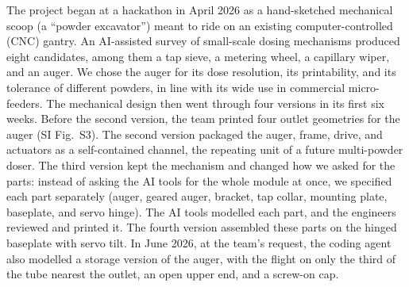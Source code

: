 \documentclass[twoside,twocolumn,9pt]{article}
\begin{document}
The project began at a hackathon in April 2026 as a hand-sketched mechanical scoop (a ``powder excavator'') meant to ride on an existing computer-controlled (CNC) gantry. An AI-assisted survey of small-scale dosing mechanisms\cite{Besenhard2017Micro,Faulhammer2014Dose} produced eight candidates, among them a tap sieve, a metering wheel, a capillary wiper, and an auger. We chose the auger for its dose resolution, its printability, and its tolerance of different powders, in line with its wide use in commercial micro-feeders.\cite{Yang2007Metering,Besenhard2015Accuracy} The mechanical design then went through four versions in its first six weeks. Before the second version, the team printed four outlet geometries for the auger (SI Fig.~S3). The second version packaged the auger, frame, drive, and actuators as a self-contained channel, the repeating unit of a future multi-powder doser. The third version kept the mechanism and changed how we asked for the parts: instead of asking the AI tools for the whole module at once, we specified each part separately (auger, geared auger, bracket, tap collar, mounting plate, baseplate, and servo hinge). The AI tools modelled each part, and the engineers reviewed and printed it. The fourth version assembled these parts on the hinged baseplate with servo tilt. In June 2026, at the team's request, the coding agent also modelled a storage version of the auger, with the flight on only the third of the tube nearest the outlet, an open upper end, and a screw-on cap.
\end{document}
